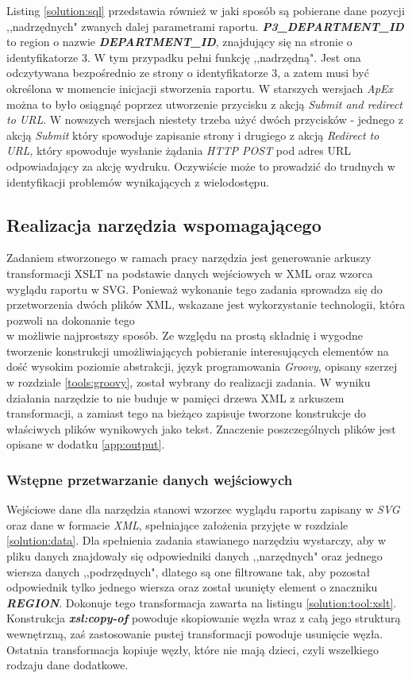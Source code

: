 \documentclass[11pt,a4paper]{article}
\begin{document}
Listing \ref{solution:sql} przedstawia również w jaki sposób są pobierane dane pozycji ,,nadrzędnych" zwanych dalej parametrami raportu. \textbf{\emph{P3\_DEPARTMENT\_ID}} to region o nazwie \textbf{\emph{DEPARTMENT\_ID}}, znajdujący się na stronie o identyfikatorze 3. W tym przypadku pełni funkcję ,,nadrzędną". Jest ona odczytywana bezpośrednio ze strony o identyfikatorze 3, a zatem musi być określona w momencie inicjacji stworzenia raportu. W starszych wersjach \emph{ApEx} można to było osiągnąć poprzez utworzenie przycisku z akcją \emph{Submit and redirect to URL}. W nowszych wersjach niestety trzeba użyć dwóch przycisków - jednego z akcją \emph{Submit} który spowoduje zapisanie strony i drugiego z akcją \emph{Redirect to URL}, który spowoduje wysłanie żądania \emph{HTTP POST} pod adres URL odpowiadający za akcję wydruku. Oczywiście może to prowadzić do trudnych w identyfikacji problemów wynikających z wielodostępu. 

\subsection{Realizacja narzędzia wspomagającego} \label{solution:tool}
Zadaniem stworzonego w ramach pracy narzędzia jest generowanie arkuszy transformacji XSLT na podstawie danych wejściowych w XML oraz wzorca wyglądu raportu w SVG. Ponieważ wykonanie tego zadania sprowadza się do przetworzenia dwóch plików XML, wskazane jest wykorzystanie technologii, która pozwoli na dokonanie tego \\w możliwie najprostszy sposób. Ze względu na prostą składnię i wygodne tworzenie konstrukcji umożliwiających pobieranie interesujących elementów na dość wysokim poziomie abstrakcji, język programowania \emph{Groovy}, opisany szerzej w rozdziale \ref{tools:groovy}, został wybrany do realizacji zadania.  W wyniku działania narzędzie to nie buduje w pamięci drzewa XML z arkuszem transformacji, a zamiast tego na bieżąco zapisuje tworzone konstrukcje do właściwych plików wynikowych jako tekst. Znaczenie poszczególnych plików jest opisane w dodatku \ref{app:output}.

\subsubsection{Wstępne przetwarzanie danych wejściowych} \label{solution:tool:input}
Wejściowe dane dla narzędzia stanowi wzorzec wyglądu raportu zapisany w \emph{SVG} oraz dane w formacie \emph{XML}, spełniające założenia przyjęte w rozdziale \ref{solution:data}.  Dla spełnienia zadania stawianego narzędziu wystarczy, aby w pliku danych znajdowały się odpowiedniki danych ,,narzędnych" oraz jednego wiersza danych ,,podrzędnych", dlatego są one filtrowane tak, aby pozostał odpowiednik tylko jednego wiersza oraz został usunięty element o znaczniku \emph{\textbf{REGION}}. Dokonuje tego transformacja zawarta na listingu \ref{solution:tool:xslt}. Konstrukcja \textbf{\emph{xsl:copy-of}} powoduje skopiowanie węzła wraz z całą jego strukturą wewnętrzną, zaś zastosowanie pustej transformacji powoduje usunięcie węzła. Ostatnia transformacja kopiuje węzły, które nie mają dzieci, czyli wszelkiego rodzaju dane dodatkowe. 
\end{document}
